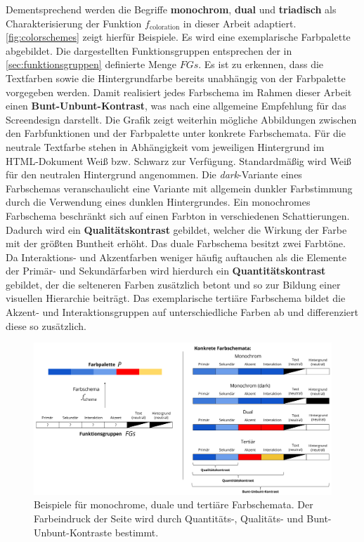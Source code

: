 Dementsprechend werden die Begriffe \textbf{monochrom}, \textbf{dual} und \textbf{triadisch} als Charakterisierung der Funktion $f_\text{coloration}$ in dieser Arbeit adaptiert. \autoref{fig:colorschemes} zeigt hierfür Beispiele. Es wird eine exemplarische Farbpalette abgebildet. Die dargestellten Funktionsgruppen entsprechen der in \autoref{sec:funktionsgruppen} definierte Menge $FGs$. Es ist zu erkennen, dass die Textfarben sowie die Hintergrundfarbe bereits unabhängig von der Farbpalette vorgegeben werden. Damit realisiert jedes Farbschema im Rahmen dieser Arbeit einen \textbf{Bunt-Unbunt-Kontrast}, was nach \citep{webx0} eine allgemeine Empfehlung für das Screendesign darstellt. Die Grafik zeigt weiterhin mögliche Abbildungen zwischen den Farbfunktionen und der Farbpalette unter \glqq{}konkrete Farbschemata\grqq{}. Für die neutrale Textfarbe stehen in Abhängigkeit vom jeweiligen Hintergrund im HTML-Dokument Weiß bzw. Schwarz zur Verfügung. Standardmäßig wird Weiß für den neutralen Hintergrund angenommen. Die \emph{dark}-Variante eines Farbschemas veranschaulicht eine Variante mit allgemein dunkler Farbstimmung durch die Verwendung eines dunklen Hintergrundes. Ein monochromes Farbschema beschränkt sich auf einen Farbton in verschiedenen Schattierungen. Dadurch wird ein \textbf{Qualitätskontrast} gebildet, welcher die Wirkung der Farbe mit der größten Buntheit erhöht. Das duale Farbschema besitzt zwei Farbtöne. Da Interaktions- und Akzentfarben weniger häufig auftauchen als die Elemente der Primär- und Sekundärfarben wird hierdurch ein \textbf{Quantitätskontrast} gebildet, der die selteneren Farben zusätzlich betont und so zur Bildung einer visuellen Hierarchie beiträgt. Das exemplarische tertiäre Farbschema bildet die Akzent- und Interaktionsgruppen auf unterschiedliche Farben ab und differenziert diese so zusätzlich. 

\begin{figure}[h]
	\centering
	\includegraphics[width=1\textwidth]{img/colorschemes.png}
	\caption{Beispiele für monochrome, duale und tertiäre Farbschemata. Der Farbeindruck der Seite wird durch Quantitäts-, Qualitäts- und Bunt-Unbunt-Kontraste bestimmt.}
	\label{fig:colorschemes}
\end{figure}
